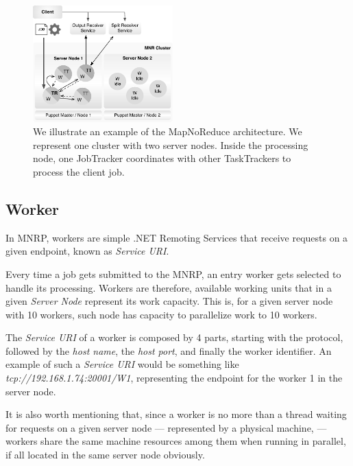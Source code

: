 \documentclass[times, 10pt,twocolumn]{article}
\begin{document}
        \begin{figure}[!h]
            \begin{center}
                \includegraphics[width=0.48\textwidth]{pics/architecture.pdf}
                \caption{We illustrate an example of the MapNoReduce architecture. We represent one cluster with two server nodes. Inside the processing node, one JobTracker coordinates with other TaskTrackers to process the client job.  }
                \label{fig:mnr-architecture}
            \end{center}
        \end{figure}

    	\subsection{Worker}

        In \ac{MNRP}, workers are simple .NET Remoting Services that receive requests on a given endpoint, known as \emph{Service URI}.

        Every time a job gets submitted to the \ac{MNRP}, an entry worker gets selected to handle its processing. Workers are therefore, available working units that in a given \emph{Server Node} represent its work capacity. This is, for a given server node with 10 workers, such node has capacity to parallelize work to 10 workers.

        The \emph{Service URI} of a worker is composed by 4 parts, starting with the protocol, followed by the \emph{host name}, the \emph{host port}, and finally the worker identifier. An example of such a \emph{Service URI} would be something like \emph{{\small tcp://192.168.1.74:20001/W1}}, representing the endpoint for the worker 1 in the server node.

        It is also worth mentioning that, since a worker is no more than a thread waiting for requests on a given server node — represented by a physical machine, — workers share the same machine resources among them when running in parallel, if all located in the same server node obviously.
\end{document}
